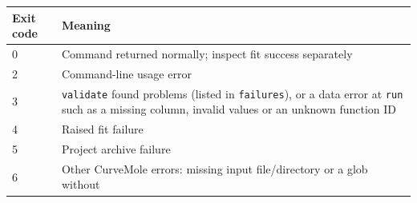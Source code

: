 \documentclass[
  10pt,
  a4paper,
  oneside]{scrreprt}
\begin{document}
\begin{longtable}[]{@{}ll@{}}
\toprule
\begin{minipage}[b]{0.47\columnwidth}\raggedright
Exit code\strut
\end{minipage} & \begin{minipage}[b]{0.47\columnwidth}\raggedright
Meaning\strut
\end{minipage}\tabularnewline
\midrule
\endhead
\begin{minipage}[t]{0.47\columnwidth}\raggedright
0\strut
\end{minipage} & \begin{minipage}[t]{0.47\columnwidth}\raggedright
Command returned normally; inspect fit success separately\strut
\end{minipage}\tabularnewline
\begin{minipage}[t]{0.47\columnwidth}\raggedright
2\strut
\end{minipage} & \begin{minipage}[t]{0.47\columnwidth}\raggedright
Command-line usage error\strut
\end{minipage}\tabularnewline
\begin{minipage}[t]{0.47\columnwidth}\raggedright
3\strut
\end{minipage} & \begin{minipage}[t]{0.47\columnwidth}\raggedright
\texttt{validate} found problems (listed in \texttt{failures}), or a
data error at \texttt{run} such as a missing column, invalid values or
an unknown function ID\strut
\end{minipage}\tabularnewline
\begin{minipage}[t]{0.47\columnwidth}\raggedright
4\strut
\end{minipage} & \begin{minipage}[t]{0.47\columnwidth}\raggedright
Raised fit failure\strut
\end{minipage}\tabularnewline
\begin{minipage}[t]{0.47\columnwidth}\raggedright
5\strut
\end{minipage} & \begin{minipage}[t]{0.47\columnwidth}\raggedright
Project archive failure\strut
\end{minipage}\tabularnewline
\begin{minipage}[t]{0.47\columnwidth}\raggedright
6\strut
\end{minipage} & \begin{minipage}[t]{0.47\columnwidth}\raggedright
Other CurveMole errors: missing input file/directory or a glob without

\end{minipage}
\end{longtable}
\end{document}
